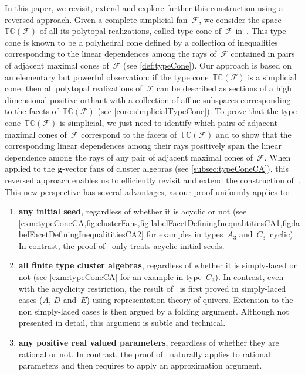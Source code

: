 \documentclass{amsart}
\theoremstyle{definition}
\renewcommand{\b}[1]{{\boldsymbol{#1}}} %
\newcommand{\Fan}{\mathcal{F}} %
\newcommand{\typeCone}{\mathbb{TC}} %
\begin{document}
\medskip
\enlargethispage{.5cm}
In this paper, we revisit, extend and explore further this construction using a reversed approach.
Given a complete simplicial fan~$\Fan$, we consider the space~$\typeCone(\Fan)$ of all its polytopal realizations, called type cone of~$\Fan$ in~\cite{McMullen-typeCone}.
This type cone is known to be a polyhedral cone defined by a collection of inequalities corresponding to the linear dependences among the rays of~$\Fan$ contained in pairs of adjacent maximal cones of~$\Fan$ (see \cref{def:typeCone}).
Our approach is based on an elementary but powerful observation: if the type cone~$\typeCone(\Fan)$ is a simplicial cone, then all polytopal realizations of~$\Fan$ can be described as sections of a high dimensional positive orthant with a collection of affine subspaces corresponding to the facets of~$\typeCone(\Fan)$ (see \cref{coro:simplicialTypeCone}).
To prove that the type cone~$\typeCone(\Fan)$ is simplicial, we just need to identify which pairs of adjacent maximal cones of~$\Fan$ correspond to the facets of~$\typeCone(\Fan)$ and to show that the corresponding linear dependences among their rays positively span the linear dependence among the rays of any pair of adjacent maximal cones of~$\Fan$.
When applied to the $\b{g}$-vector fans of cluster algebras (see \cref{subsec:typeConeCA}), this reversed approach enables us to efficiently revisit and extend the construction of~\cite{BazierMatteDouvilleMousavandThomasYildirim}.
This new perspective has several advantages, as our proof uniformly applies to:

\smallskip
\begin{enumerate}[$\quad\bullet$]
\item \textbf{any initial seed}, regardless of whether it is acyclic or not (see \cref{exm:typeConeCA,fig:clusterFans,fig:labelFacetDefiningInequalititiesCA1,fig:labelFacetDefiningInequalititiesCA2} for examples in types~$A_3$ and~$C_3$~cyclic). In contrast, the proof of~\cite{BazierMatteDouvilleMousavandThomasYildirim} only treats acyclic initial seeds.

\smallskip
\item \textbf{all finite type cluster algebras}, regardless of whether it is simply-laced or not (see \cref{exm:typeConeCA} for an example in type~$C_3$). In contrast, even with the acyclicity restriction, the result of~\cite{BazierMatteDouvilleMousavandThomasYildirim} is first proved in simply-laced cases ($A$, $D$ and~$E$) using representation theory of quivers. Extension to the non simply-laced cases is then argued by a folding argument. Although not presented in detail, this argument is subtle and technical.

\smallskip
\item \textbf{any positive real valued parameters}, regardless of whether they are rational or not. In contrast, the proof of~\cite{BazierMatteDouvilleMousavandThomasYildirim} naturally applies to rational parameters and then requires to apply an approximation argument.
\end{enumerate}
\end{document}
